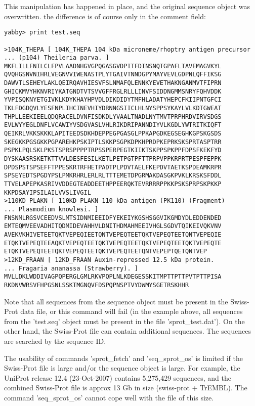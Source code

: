 This manipulation has happened in place, and the original
sequence object was overwritten. the difference is of course
only in the comment field:

\begin{verbatim}
yabby> print test.seq

>104K_THEPA [ 104K_THEPA 104 kDa microneme/rhoptry antigen precursor
... (p104) Theileria parva. ]
MKFLILLFNILCLFPVLAADNHGVGPQGASGVDPITFDINSNQTGPAFLTAVEMAGVKYL
QVQHGSNVNIHRLVEGNVVIWENASTPLYTGAIVTNNDGPYMAYVEVLGDPNLQFFIKSG
DAWVTLSEHEYLAKLQEIRQAVHIESVFSLNMAFQLENNKYEVETHAKNGANMVTFIPRN
GHICKMVYHKNVRIYKATGNDTVTSVVGFFRGLRLLLINVFSIDDNGMMSNRYFQHVDDK
YVPISQKNYETGIVKLKDYKHAYHPVDLDIKDIDYTMFHLADATYHEPCFKIIPNTGFCI
TKLFDGDQVLYESFNPLIHCINEVHIYDRNNGSIICLHLNYSPPSYKAYLVLKDTGWEAT
THPLLEEKIEELQDQRACELDVNFISDKDLYVAALTNADLNYTMVTPRPHRDVIRVSDGS
EVLWYYEGLDNFLVCAWIYVSDGVASLVHLRIKDRIPANNDIYVLKGDLYWTRITKIQFT
QEIKRLVKKSKKKLAPITEEDSDKHDEPPEGPGASGLPPKAPGDKEGSEGHKGPSKGSDS
SKEGKKPGSGKKPGPAREHKPSKIPTLSKKPSGPKDPKHPRDPKEPRKSKSPRTASPTRR
PSPKLPQLSKLPKSTSPRSPPPPTRPSSPERPEGTKIIKTSKPPSPKPPFDPSFKEKFYD
DYSKAASRSKETKTTVVLDESFESILKETLPETPGTPFTTPRPVPPKRPRTPESPFEPPK
DPDSPSTSPSEFFTPPESKRTRFHETPADTPLPDVTAELFKEPDVTAETKSPDEAMKRPR
SPSEYEDTSPGDYPSLPMKRHRLERLRLTTTEMETDPGRMAKDASGKPVKLKRSKSFDDL
TTVELAPEPKASRIVVDDEGTEADDEETHPPEERQKTEVRRRRPPKKPSKSPRPSKPKKP
KKPDSAYIPSILAILVVSLIVGIL
>110KD_PLAKN [ 110KD_PLAKN 110 kDa antigen (PK110) (Fragment)
... Plasmodium knowlesi. ]
FNSNMLRGSVCEEDVSLMTSIDNMIEEIDFYEKEIYKGSHSGGVIKGMDYDLEDDENDED
EMTEQMVEEVADHITQDMIDEVAHHVLDNITHDMAHMEEIVHGLSGDVTQIKEIVQKVNV
AVEKVKHIVETEETQKTVEPEQIEETQNTVEPEQTEETQKTVEPEQTEETQNTVEPEQIE
ETQKTVEPEQTEEAQKTVEPEQTEETQKTVEPEQTEETQKTVEPEQTEETQKTVEPEQTE
ETQKTVEPEQTEETQKTVEPEQTEETQKTVEPEQTEETQNTVEPEPTQETQNTVEP
>12KD_FRAAN [ 12KD_FRAAN Auxin-repressed 12.5 kDa protein.
... Fragaria ananassa (Strawberry). ]
MVLLDKLWDDIVAGPQPERGLGMLRKVPQPLNLKDEGESSKITMPTTPTTPVTPTTPISA
RKDNVWRSVFHPGSNLSSKTMGNQVFDSPQPNSPTVYDWMYSGETRSKHHR
\end{verbatim}

Note that all sequences from the sequence object must be
present in the Swiss-Prot data file, or this command will
fail (in the example above, all sequences from the 'test.seq'
object must be present in the file 'sprot\_test.dat'). On
the other hand, the Swiss-Prot file can contain additional
sequences. The sequences are searched by the sequence ID. 

The usability of commands 'sprot\_fetch' and 'seq\_sprot\_os'
is limited if the Swiss-Prot file is large and/or the sequence
object is large. For example, the UniProt release 12.4
(23-Oct-2007) contains 5,275,429 sequences, and the combined
Swiss-Prot file is approx 13 Gb in size (swiss-prot + TrEMBL).
The command 'seq\_sprot\_os' cannot cope well with the file
of this size.

